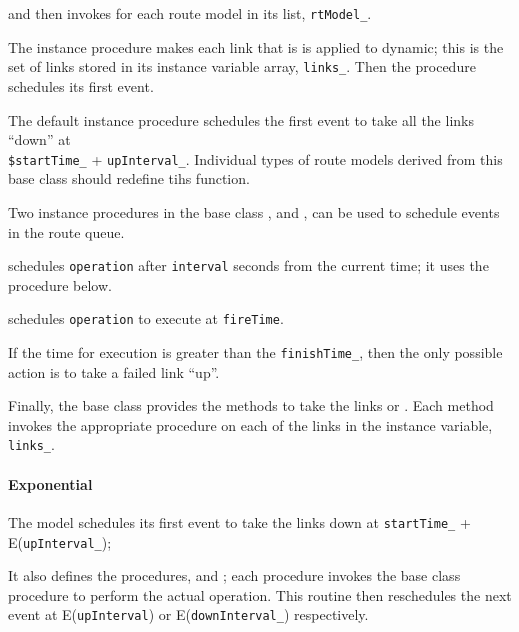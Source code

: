 and then invokes  for each route model in its list,
{\tt rtModel\_}.
\begin{list}{}{}
\item The instance procedure
  makes each link that is is applied to dynamic;
  this is the set of links stored in its instance variable array,
  {\tt links\_}.
  Then the procedure schedules its first event.
\item The default instance procedure
  schedules the first event to take all the links ``down'' at \\
  {\tt \$startTime\_} + {\tt upInterval\_}.
  Individual types of route models derived from this base class should
  redefine tihs function.
\item Two instance procedures in the base class ,
   and
  ,
  can be used to schedule events in the route queue.

   schedules {\tt operation}
  after {\tt interval} seconds from the current time; it uses the
  procedure  below.

   schedules {\tt operation}
  to execute at {\tt fireTime}.

  If the time for execution is greater than the {\tt finishTime\_},
  then the only possible action is to take a failed link ``up''.

\item  Finally, the base class provides the methods to take the links
   or
  .
  Each method invokes the appropriate procedure on each of the links
  in the instance variable, {\tt links\_}.
\end{list}

\paragraph{Exponential}
The model schedules its first event to take the links down
at {\tt startTime\_} + E({\tt upInterval\_});

It also defines the procedures,  and ;
each procedure invokes the base class procedure to perform the actual operation.
This routine then reschedules the next event at
E({\tt upInterval}) or E({\tt downInterval\_}) respectively.

